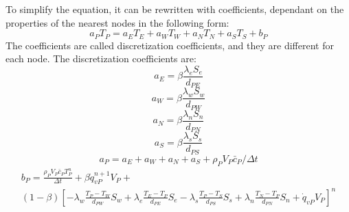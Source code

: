 \label{DiscrCond}
To simplify the equation, it can be rewritten with coefficients, dependant on the properties of the nearest nodes in the following form:
\begin{equation}
a_{P}T_{P}=a_{E}T_{E}+a_{W}T_{W}+a_{N}T_{N}+a_{S}T_{S}+b_{P}
\end{equation}
The coefficients are called discretization coefficients, and they are different for each node. The discretization coefficients are:
\begin{equation}
a_{E}=\beta\frac{\lambda_{e}S_{e}}{d_{PE}}
\end{equation}
\begin{equation}
a_{W}=\beta\frac{\lambda_{w}S_{w}}{d_{PW}}
\end{equation}
\begin{equation}
a_{N}=\beta\frac{\lambda_{n}S_{n}}{d_{PN}}
\end{equation}
\begin{equation}
a_{S}=\beta\frac{\lambda_{s}S_{s}}{d_{PS}}
\end{equation}
\begin{equation}
a_{P}=a_{E}+a_{W}+a_{N}+a_{S}+\rho_{P}V_{P}\bar{c}_{P}/\Delta t
\end{equation}
\begin{multline}
b_{P}=\frac{\rho_{P}V_{P}\bar{c}_{P}T_{P}^{n}}{\Delta t}+\beta\dot{q}_{vP}^{n+1}V_{P}+ \\
\left(1-\beta\right)\left[-\lambda_{w}\frac{T_{P}-T_{W}}{d_{PW}}S_{w}+\lambda_{e}\frac{T_{E}-T_{P}}{d_{PE}}S_{e}-\lambda_{s}\frac{T_{P}-T_{S}}{d_{PS}}S_{s}+\lambda_{n}\frac{T_{N}-T_{P}}{d_{PN}}S_{n}+\dot{q}_{vP}V_{P}\right]^{n}
\end{multline}

